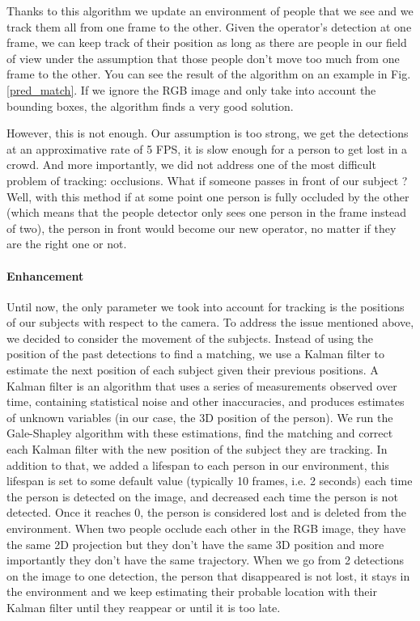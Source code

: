 \documentclass[a4paper, twocolumn]{article}
\begin{document}
    Thanks to this algorithm we update an environment of people that we see and we track them all from one frame to the other. Given the operator's detection at one frame, we can keep track of their position as long as there are people in our field of view under the assumption that those people don't move too much from one frame to the other. You can see the result of the algorithm on an example in Fig. \ref{pred_match}. If we ignore the RGB image and only take into account the bounding boxes, the algorithm finds a very good solution.

    However, this is not enough. Our assumption is too strong, we get the detections at an approximative rate of 5 FPS, it is slow enough for a person to get lost in a crowd. And more importantly, we did not address one of the most difficult problem of tracking: occlusions. What if someone passes in front of our subject ? Well, with this method if at some point one person is fully occluded by the other (which means that the people detector only sees one person in the frame instead of two), the person in front would become our new operator, no matter if they are the right one or not.

    \paragraph{Enhancement} Until now, the only parameter we took into account for tracking is the positions of our subjects with respect to the camera. To address the issue mentioned above, we decided to consider the movement of the subjects. Instead of using the position of the past detections to find a matching, we use a Kalman filter \cite{kalman} to estimate the next position of each subject given their previous positions. A Kalman filter is an algorithm that uses a series of measurements observed over time, containing statistical noise and other inaccuracies, and produces estimates of unknown variables (in our case, the 3D position of the person). We run the Gale-Shapley algorithm with these estimations, find the matching and correct each Kalman filter with the new position of the subject they are tracking. In addition to that, we added a lifespan to each person in our environment, this lifespan is set to some default value (typically 10 frames, i.e. 2 seconds) each time the person is detected on the image, and decreased each time the person is not detected. Once it reaches 0, the person is considered lost and is deleted from the environment. When two people occlude each other in the RGB image, they have the same 2D projection but they don't have the same 3D position and more importantly they don't have the same trajectory. When we go from 2 detections on the image to one detection, the person that disappeared is not lost, it stays in the environment and we keep estimating their probable location with their Kalman filter until they reappear or until it is too late.\\
\end{document}
